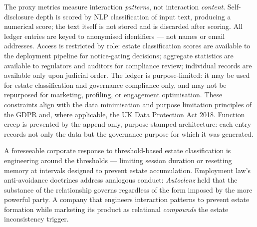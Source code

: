 The proxy metrics measure interaction \emph{patterns}, not interaction \emph{content}. Self-disclosure depth is scored by NLP classification of input text, producing a numerical score; the text itself is not stored and is discarded after scoring. All ledger entries are keyed to anonymised identifiers --- not names or email addresses. Access is restricted by role: estate classification scores are available to the deployment pipeline for notice-gating decisions; aggregate statistics are available to regulators and auditors for compliance review; individual records are available only upon judicial order. The ledger is purpose-limited: it may be used for estate classification and governance compliance only, and may not be repurposed for marketing, profiling, or engagement optimisation. These constraints align with the data minimisation and purpose limitation principles of the GDPR and, where applicable, the UK Data Protection Act 2018. Function creep is prevented by the append-only, purpose-stamped architecture: each entry records not only the data but the governance purpose for which it was generated.

A foreseeable corporate response to threshold-based estate classification is engineering around the thresholds --- limiting session duration or resetting memory at intervals designed to prevent estate accumulation. Employment law's anti-avoidance doctrines address analogous conduct: \emph{Autoclenz} held that the substance of the relationship governs regardless of the form imposed by the more powerful party. A company that engineers interaction patterns to prevent estate formation while marketing its product as relational \emph{compounds} the estate inconsistency trigger.
